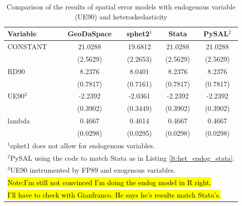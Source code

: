 \documentclass{article}
\begin{document}
\begin{table}[htpb]
\caption{Comparison of the results of spatial error models with endogenous variable (UE90) and heteroskedasticity}
\label{t:res_het_endog}
\centering
\begin{small}
\begin{tabular}{l|cccc} \hline
\textbf{Variable}&\textbf{GeoDaSpace}&\textbf{sphet2$^1$}&\textbf{Stata}&\textbf{PySAL$^2$}\\ \hline
CONSTANT&21.0288&19.6812&21.0288&21.0288\\
&(2.5629)&(2.2653)&(2.5629)&(2.5629)\\
RD90&8.2376&8.0401&8.2376&8.2376\\
&(0.7817)&(0.7161)&(0.7817)&(0.7817)\\
UE90$^3$&-2.2392&-2.0361&-2.2392&-2.2392\\
&(0.3902)&(0.3449)&(0.3902)&(0.3902)\\
lambda&0.4667&0.4614&0.4667&0.4667\\
&(0.0298)&(0.0295)&(0.0298)&(0.0298)\\
\hline
\multicolumn{5}{l}{\scriptsize{$^1$sphet1 does not allow for endogenous variables.}} \\
\multicolumn{5}{l}{\scriptsize{$^2$PySAL using the code to match Stata as in Listing \ref{lt:het_endog_stata}.}} \\
\multicolumn{5}{l}{\scriptsize{$^3$UE90 instrumented by FP89 and exogenous variables.}} \\
\multicolumn{5}{l}{\scriptsize{\hl{Note:I'm still not convinced I'm doing the endog model in R right.}}} \\
\multicolumn{5}{l}{\scriptsize{\hl{I'll have to check with Gianfranco. He says he's results match Stata's.}}} \\
\end{tabular}
\end{small}
\end{table}
\end{document}

